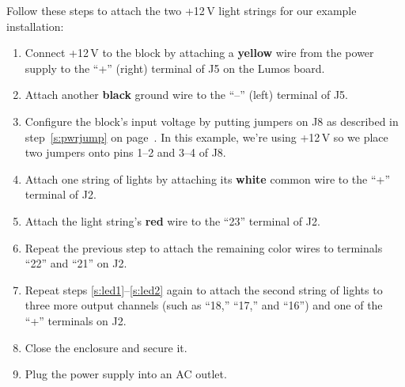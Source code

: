 \documentclass[letterpaper,twoside,onecolumn,openright,final]{memoir}
\begin{document}
Follow these steps to attach the two +12\,V light strings for our example installation:

\begin{enumerate}
	\item 	Connect +12\,V to the block by attaching a {\bfseries yellow} wire from the power supply to
		the ``+'' (right) terminal of J5 on the Lumos board.

	\item	Attach another {\bfseries black} ground wire to the ``--'' (left) terminal of J5.

	\item	Configure the block's input voltage by putting jumpers on J8 as described in 
		step~\ref{s:pwrjump} on page~\pageref{s:pwrjump}.  In this example, we're using +12\,V so we place
		two jumpers onto pins 1--2 and 3--4 of J8.

	\item\label{s:led1}
		Attach one string of  lights by attaching its {\bfseries white} common wire to the ``+''
		terminal of J2.

	\item	Attach the light string's {\bfseries red} wire to the ``23'' terminal of J2.

	\item\label{s:led2}
		Repeat the previous step to attach the remaining color wires to terminals ``22'' and ``21'' on J2.

	\item	Repeat steps \ref{s:led1}--\ref{s:led2} again to attach the second string of lights to three
		more output channels (such as ``18,'' ``17,'' and ``16'') and one of the ``+'' terminals on J2.

	\item	Close the enclosure and secure it.

	\item	Plug the power supply into an AC outlet.
\end{enumerate}
\end{document}
